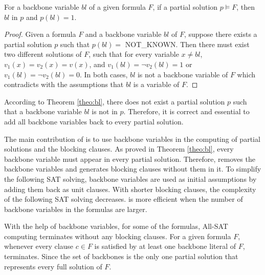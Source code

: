 \begin{theorem} \label{theo:bl}
For a backbone variable $bl$ of a given formula $F$, if a partial solution $p\models F$, then $bl$ in $p$ and $p(bl)=1$.
\end{theorem}

\begin{proof}
Given a formula $F$ and a backbone variable $bl$ of $F$, suppose there exists a partial solution $p$ such that $p(bl)=$ NOT\_KNOWN. Then there must exist two different solutions of $F$, such that for every variable $x\neq bl$, $v_1(x)=v_2(x)=v(x)$, and $v_1(bl)=\neg v_2(bl)=1$ or $v_1(bl)=\neg v_2(bl)=0$. In both cases, $bl$ is not a backbone variable of $F$ which contradicts with the assumptions that $bl$ is a variable of $F$.
\end{proof}
According to Theorem \ref{theo:bl}, there does not exist a partial solution $p$ such that a backbone variable $bl$ is not in $p$. Therefore, it is correct and essential to add all backbone variables back to every partial solution.

The main contribution of \tool is to use backbone variables in the computing of partial solutions and the blocking clauses. As proved in Theorem \ref{theo:bl}, every backbone variable must appear in every partial solution. Therefore, \tool removes the backbone variables and generates blocking clauses without them in it. To simplify the following SAT solving, backbone variables are used as initial assumptions by adding them back as unit clauses. With shorter blocking clauses, the complexity of the following SAT solving decreases. \tool is more efficient when the number of backbone variables in the formulas are larger. 

With the help of backbone variables, for some of the formulas, All-SAT computing terminates without any blocking clauses.
For a given formula $F$, whenever every clause $c\in F$ is satisfied by at least one backbone literal of $F$, \tool terminates. Since the set of backbones is the only one partial solution that represents every full solution of $F$.

